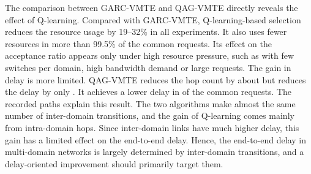 The comparison between GARC-VMTE and QAG-VMTE directly reveals the effect of Q-learning. Compared with GARC-VMTE, Q-learning-based selection reduces the resource usage by 19--32\% in all experiments. It also uses fewer resources in more than 99.5\% of the common requests.  Its effect on the acceptance ratio appears only under high resource pressure, such as with few switches per domain, high bandwidth demand or large requests. The gain in delay is more limited. QAG-VMTE reduces the hop count by about  but reduces the delay by only . It achieves a lower delay in  of the common requests. The recorded paths explain this result. The two algorithms make almost the same number of inter-domain transitions, and the gain of Q-learning comes mainly from intra-domain hops. Since inter-domain links have much higher delay, this gain has a limited effect on the end-to-end delay. Hence, the end-to-end delay in multi-domain networks is largely determined by inter-domain transitions, and a delay-oriented improvement should primarily target them.
